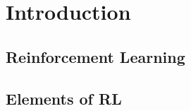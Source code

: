 \chapter{Introduction}
\label{chap:ch_1_intro}

\section{Reinforcement Learning}
\section{Elements of RL}